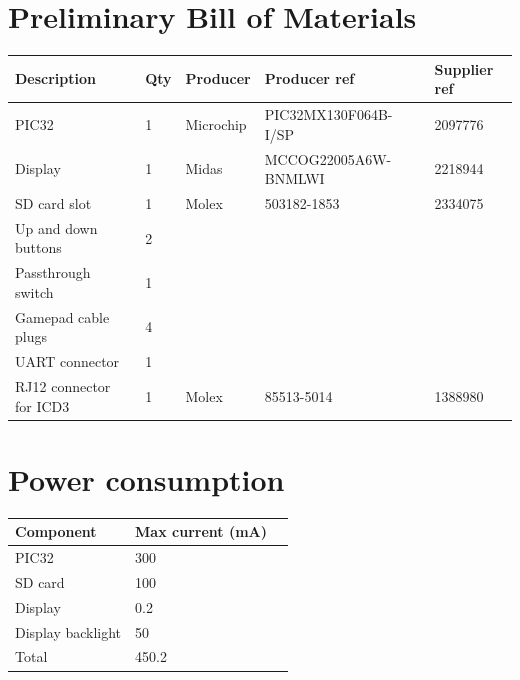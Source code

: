 \documentclass[a4paper,oneside,12pt]{article}
\begin{document}
\section{Preliminary Bill of Materials}
\begin{tabular}{|l|l|l|l|l|}
  \hline
  Description & Qty & Producer & Producer ref & Supplier ref \\
  \hline
  PIC32 & 1 & Microchip & PIC32MX130F064B-I/SP & 2097776 \\
  \hline
  Display & 1 & Midas & MCCOG22005A6W-BNMLWI & 2218944 \\
  \hline
  SD card slot & 1 & Molex & 503182-1853 & 2334075 \\
  \hline
  Up and down buttons & 2 & & &\\
  \hline
  Passthrough switch & 1 & & &\\
  \hline
  Gamepad cable plugs & 4 & & &\\
  \hline
  UART connector & 1 & & &\\
  \hline
  RJ12 connector for ICD3 & 1 & Molex & 85513-5014 & 1388980 \\
  \hline
\end{tabular}

\section{Power consumption}
\begin{tabular}{|l|l|l|}
  \hline
  Component & Max current (\si{\mA}) \\
  \hline
  PIC32 & 300 \\
  \hline
  SD card & 100\\
  \hline
  Display & 0.2 \\
  \hline
  Display backlight & 50 \\
  \hline
  Total & 450.2\\
  \hline
\end{tabular}
\end{document}
